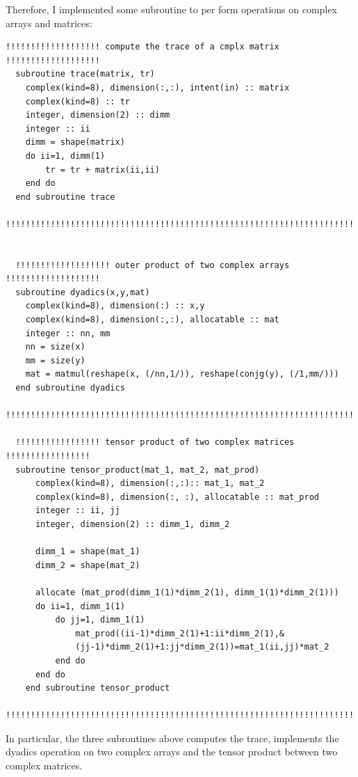 \documentclass[prb,9pt,notitlepage]{revtex4-1}
\begin{document}
Therefore, I implemented some subroutine to per form operations on complex arrays and matrices:
\begin{lstlisting}
!!!!!!!!!!!!!!!!!!! compute the trace of a cmplx matrix !!!!!!!!!!!!!!!!!!!
  subroutine trace(matrix, tr)
    complex(kind=8), dimension(:,:), intent(in) :: matrix
    complex(kind=8) :: tr
    integer, dimension(2) :: dimm
    integer :: ii
    dimm = shape(matrix)
    do ii=1, dimm(1)
        tr = tr + matrix(ii,ii)
    end do
  end subroutine trace
  !!!!!!!!!!!!!!!!!!!!!!!!!!!!!!!!!!!!!!!!!!!!!!!!!!!!!!!!!!!!!!!!!!!!!!!!


  !!!!!!!!!!!!!!!!!!! outer product of two complex arrays !!!!!!!!!!!!!!!!!!!
  subroutine dyadics(x,y,mat)
    complex(kind=8), dimension(:) :: x,y
    complex(kind=8), dimension(:,:), allocatable :: mat
    integer :: nn, mm
    nn = size(x)
    mm = size(y)
    mat = matmul(reshape(x, (/nn,1/)), reshape(conjg(y), (/1,mm/)))
  end subroutine dyadics
  !!!!!!!!!!!!!!!!!!!!!!!!!!!!!!!!!!!!!!!!!!!!!!!!!!!!!!!!!!!!!!!!!!!!!!!!

  !!!!!!!!!!!!!!!!! tensor product of two complex matrices !!!!!!!!!!!!!!!!!
  subroutine tensor_product(mat_1, mat_2, mat_prod)
      complex(kind=8), dimension(:,:):: mat_1, mat_2
      complex(kind=8), dimension(:, :), allocatable :: mat_prod
      integer :: ii, jj
      integer, dimension(2) :: dimm_1, dimm_2

      dimm_1 = shape(mat_1)
      dimm_2 = shape(mat_2)

      allocate (mat_prod(dimm_1(1)*dimm_2(1), dimm_1(1)*dimm_2(1)))
      do ii=1, dimm_1(1)
          do jj=1, dimm_1(1)
              mat_prod((ii-1)*dimm_2(1)+1:ii*dimm_2(1),&
              (jj-1)*dimm_2(1)+1:jj*dimm_2(1))=mat_1(ii,jj)*mat_2
          end do
      end do
    end subroutine tensor_product
  !!!!!!!!!!!!!!!!!!!!!!!!!!!!!!!!!!!!!!!!!!!!!!!!!!!!!!!!!!!!!!!!!!!!!!!!
\end{lstlisting}
In particular, the three subroutines above computes the trace, implements the dyadics operation on two complex arrays  and the tensor product between two complex matrices.
\end{document}

